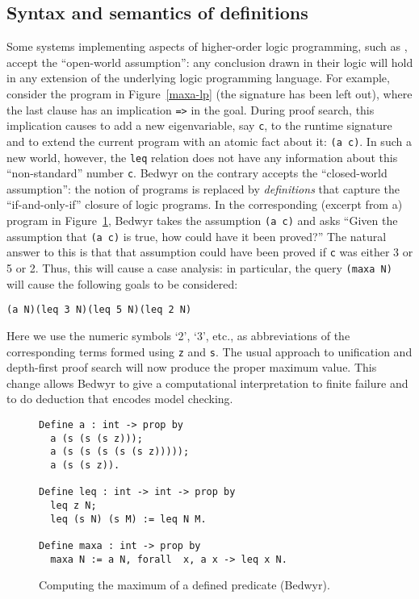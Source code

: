 \subsection{Syntax and semantics of definitions}

Some systems implementing aspects of higher-order logic programming,
such as \lp{}, accept the ``open-world assumption'': any conclusion
drawn in their logic will hold in any extension of the underlying logic
programming language.
For example, consider the \lp{} program in Figure~\ref{maxa-lp} (the
signature has been left out), where the last clause has an implication
\verb.=>. in the goal. During proof search, this implication
causes \lp{} to add a new eigenvariable, say \verb.c., to the runtime
signature
and to extend the current program with an atomic fact about it:
\verb.(a c).. In such a new world, however, the {\tt leq} relation
does not have any information about this ``non-standard'' number
{\tt c}.
Bedwyr on the contrary accepts the ``closed-world assumption'': the
notion of programs is replaced by {\em definitions} that capture the
``if-and-only-if'' closure of logic programs. In the corresponding
(excerpt from a) program in Figure~\ref{maxa-bdw}, Bedwyr takes the
assumption \verb.(a c). and asks ``Given the assumption that
\verb.(a c). is true, how could have it been proved?'' The natural
answer to this is that that assumption could have been proved if
\verb.c. was either 3 or 5 or 2. Thus, this will cause a case analysis:
in particular, the query \verb.(maxa N). will cause the following goals
to be considered:
\begin{center}
  \tt(a N)\qquad(leq 3 N)\qquad(leq 5 N)\qquad(leq 2 N)
\end{center}
Here we use the numeric symbols `2', `3', etc., as abbreviations of the
corresponding terms formed using \texttt{z} and \texttt{s}. The usual
approach to unification and depth-first proof search will now produce
the proper maximum value. This change allows Bedwyr to give a
computational interpretation to finite failure and to do deduction that
encodes model checking.

\begin{figure}
\begin{verbatim}
Define a : int -> prop by
  a (s (s (s z)));
  a (s (s (s (s (s z)))));
  a (s (s z)).

Define leq : int -> int -> prop by
  leq z N;
  leq (s N) (s M) := leq N M.

Define maxa : int -> prop by
  maxa N := a N, forall  x, a x -> leq x N.
\end{verbatim}
\caption{Computing the maximum of a defined predicate (Bedwyr).}
\label{maxa-bdw}
\end{figure}

